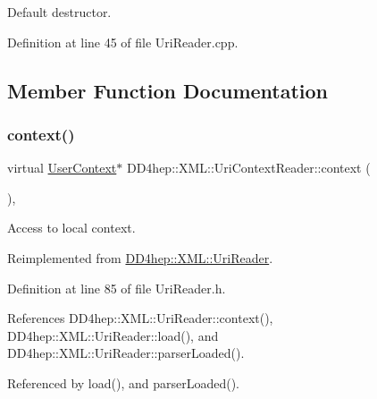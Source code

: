 Default destructor. 



Definition at line 45 of file Uri\+Reader.\+cpp.



\subsection{Member Function Documentation}
\hypertarget{class_d_d4hep_1_1_x_m_l_1_1_uri_context_reader_ad7ba7d778fdc8df96cca1e298003a403}{}\label{class_d_d4hep_1_1_x_m_l_1_1_uri_context_reader_ad7ba7d778fdc8df96cca1e298003a403} 
\subsubsection{\texorpdfstring{context()}{context()}}
{\footnotesize\ttfamily virtual \hyperlink{struct_d_d4hep_1_1_x_m_l_1_1_uri_reader_1_1_user_context}{User\+Context}$\ast$ D\+D4hep\+::\+X\+M\+L\+::\+Uri\+Context\+Reader\+::context (\begin{DoxyParamCaption}{ }\end{DoxyParamCaption})\hspace{0.3cm}{\ttfamily [inline]}, {\ttfamily [virtual]}}



Access to local context. 



Reimplemented from \hyperlink{class_d_d4hep_1_1_x_m_l_1_1_uri_reader_a9f8d06469b3e5bf1e69c72c4285dfcac}{D\+D4hep\+::\+X\+M\+L\+::\+Uri\+Reader}.



Definition at line 85 of file Uri\+Reader.\+h.



References D\+D4hep\+::\+X\+M\+L\+::\+Uri\+Reader\+::context(), D\+D4hep\+::\+X\+M\+L\+::\+Uri\+Reader\+::load(), and D\+D4hep\+::\+X\+M\+L\+::\+Uri\+Reader\+::parser\+Loaded().



Referenced by load(), and parser\+Loaded().

\hypertarget{class_d_d4hep_1_1_x_m_l_1_1_uri_context_reader_a1a6ca7eb85dadbc69463a367f396fe72}{}\label{class_d_d4hep_1_1_x_m_l_1_1_uri_context_reader_a1a6ca7eb85dadbc69463a367f396fe72} 
